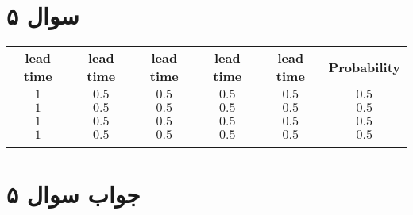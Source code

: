 \section*{سوال ۵}

\begin{table}[H]
	\centering
	\begin{tabular}{|c|c|c|c|c|c|}
		\arrayrulecolor{red}\hline
		\textbf{lead time} & \textbf{lead time} & \textbf{lead time} & \textbf{lead time} & \textbf{lead time} & \textbf{Probability} \\
		\arrayrulecolor{red}\hline
		$1$ & $0.5$ & $0.5$ & $0.5$ & $0.5$ & $0.5$ \\
		\hline
		$1$ & $0.5$ & $0.5$ & $0.5$ & $0.5$ & $0.5$ \\
		\hline
		$1$ & $0.5$ & $0.5$ & $0.5$ & $0.5$ & $0.5$ \\
		\hline
		$1$ & $0.5$ & $0.5$ & $0.5$ & $0.5$ & $0.5$ \\
		\arrayrulecolor{red}\hline
	\end{tabular}
\end{table}

\section*{جواب سوال ۵}
